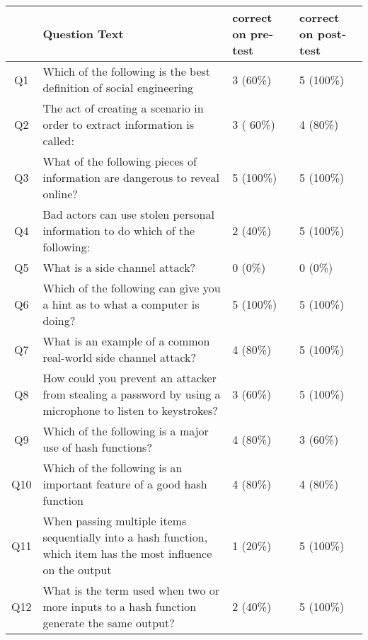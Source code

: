 

\begin{table}[h]
  \scriptsize
  \begin{tabular}{c | p{6cm} | l | l}
  & Question Text & correct on pre-test & correct on post-test    \\
\hline
Q1 & Which of the following is the best definition of social engineering & 3 (60\%) & 5 (100\%)\\
Q2  & The act of creating a scenario in order to extract information is called:  & 3 ( 60\%) & 4 (80\%) \\
Q3 & What of the following pieces of information are dangerous to reveal online?  & 5 (100\%) & 5 (100\%)\\
Q4  & Bad actors can use stolen personal information to do which of the following: & 2 (40\%) & 5 (100\%)\\
Q5 & What is a side channel attack?  & 0 (0\%) & 0 (0\%) \\
Q6  & Which of the following can give you a hint as to what a computer is doing?   & 5 (100\%) & 5 (100\%) \\
Q7 & What is an example of a common real-world side channel attack? & 4 (80\%) & 5 (100\%) \\
Q8  & How could you prevent an attacker from stealing a password by using a microphone to listen to keystrokes? & 3 (60\%) & 5 (100\%)\\
Q9 & Which of the following is a major use of hash functions? & 4 (80\%) & 3 (60\%) \\
Q10 & Which of the following is an important feature of a good hash function  & 4 (80\%) & 4 (80\%) \\
Q11 & When passing multiple items sequentially into a hash function, which item has the most influence on the output & 1 (20\%) & 5 (100\%) \\
Q12 & What is the term used when two or more inputs to a hash function generate the same output? & 2 (40\%) & 5 (100\%) \\
\end{tabular}

\end{table}
